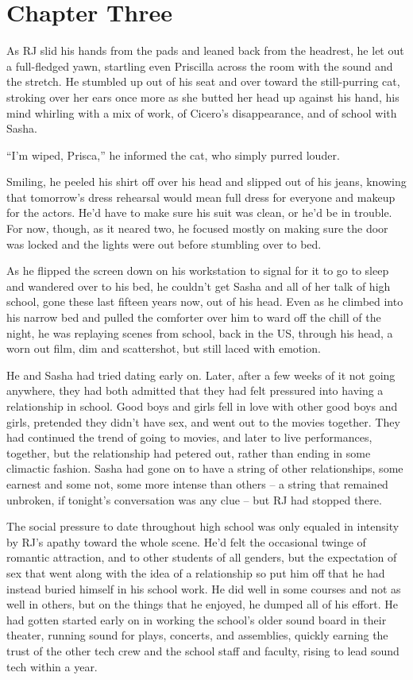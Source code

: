 \chapter*{Chapter Three}

As RJ slid his hands from the pads and leaned back from the headrest, he let out a full-fledged yawn, startling even Priscilla across the room with the sound and the stretch.  He stumbled up out of his seat and over toward the still-purring cat, stroking over her ears once more as she butted her head up against his hand, his mind whirling with a mix of work, of Cicero's disappearance, and of school with Sasha.

``I'm wiped, Prisca,'' he informed the cat, who simply purred louder.

Smiling, he peeled his shirt off over his head and slipped out of his jeans, knowing that tomorrow's dress rehearsal would mean full dress for everyone and makeup for the actors.  He'd have to make sure his suit was clean, or he'd be in trouble.  For now, though, as it neared two, he focused mostly on making sure the door was locked and the lights were out before stumbling over to bed.

As he flipped the screen down on his workstation to signal for it to go to sleep and wandered over to his bed, he couldn't get Sasha and all of her talk of high school, gone these last fifteen years now, out of his head.  Even as he climbed into his narrow bed and pulled the comforter over him to ward off the chill of the night, he was replaying scenes from school, back in the US, through his head, a worn out film, dim and scattershot, but still laced with emotion.

He and Sasha had tried dating early on.  Later, after a few weeks of it not going anywhere, they had both admitted that they had felt pressured into having a relationship in school.  Good boys and girls fell in love with other good boys and girls, pretended they didn't have sex, and went out to the movies together.  They had continued the trend of going to movies, and later to live performances, together, but the relationship had petered out, rather than ending in some climactic fashion.  Sasha had gone on to have a string of other relationships, some earnest and some not, some more intense than others -- a string that remained unbroken, if tonight's conversation was any clue -- but RJ had stopped there.

The social pressure to date throughout high school was only equaled in intensity by RJ's apathy toward the whole scene.  He'd felt the occasional twinge of romantic attraction, and to other students of all genders, but the expectation of sex that went along with the idea of a relationship so put him off that he had instead buried himself in his school work.  He did well in some courses and not as well in others, but on the things that he enjoyed, he dumped all of his effort.  He had gotten started early on in working the school's older sound board in their theater, running sound for plays, concerts, and assemblies, quickly earning the trust of the other tech crew and the school staff and faculty, rising to lead sound tech within a year.

